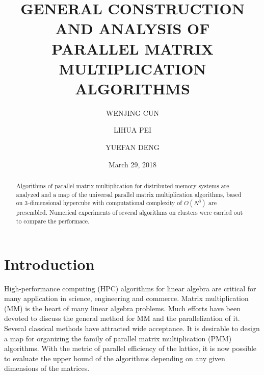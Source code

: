 \documentclass{amsart}
\theoremstyle{definition}
\theoremstyle{remark}
\numberwithin{equation}{section}
\begin{document}
\title{GENERAL CONSTRUCTION AND ANALYSIS OF \\ PARALLEL MATRIX MULTIPLICATION ALGORITHMS}

\author{WENJING CUN}
\address{Department of Applied Mathematics, Stonybrook Univ. SUNY, 
Stony Brook, New York 11790}

\author{LIHUA PEI}
\address{Department of Applied Mathematics, Stonybrook Univ. SUNY, 
Stony Brook, New York 11790}

\author{YUEFAN DENG}
\address{Department of Applied Mathematics, Stonybrook Univ. SUNY, 
Stony Brook, New York 11790}


\date{March 29, 2018}

\begin{abstract}
	Algorithms of parallel matrix multiplication for distributed-memory systems are analyzed and a map of the universal parallel matrix multiplication algorithms, based on 3-dimensional hypercube with computational complexity of $O(N^3)$ are presembled. Numerical experiments of several algorithms on clusters were carried out to compare the performace. 
\end{abstract}
\maketitle
\section{Introduction}
	High-performance computing (HPC) algorithms for linear algebra are critical for many application in science, engineering and commerce. Matrix multiplication (MM) is the heart of many linear algebra problems. Much efforts have been devoted to discuss the general method for MM  and the parallelization of it. Several classical methods have attracted wide acceptance. It is desirable to design a map for organizing the family of parallel matrix multiplication (PMM) algorithms. With the metric of parallel efficiency of the lattice, it is now possible to evaluate the upper bound of the algorithms depending on any given dimensions of the matrices.\par
\end{document}
